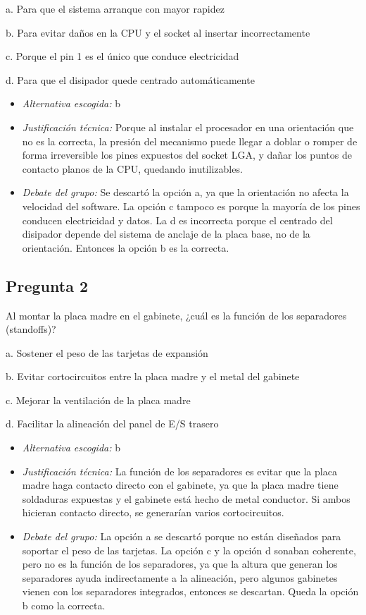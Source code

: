 \documentclass{article}
\begin{document}
a. Para que el sistema arranque con mayor rapidez 

b. Para evitar daños en la CPU y el socket al insertar incorrectamente

c. Porque el pin 1 es el único que conduce electricidad 

d. Para que el disipador quede centrado automáticamente

\begin{itemize}
\item \emph{Alternativa escogida:} b
\item \emph{Justificación técnica:} Porque al instalar el procesador en una orientación que no es la correcta, la presión del mecanismo puede llegar a doblar o romper de forma irreversible los pines expuestos del socket LGA, y dañar los puntos de contacto planos de la CPU, quedando inutilizables.
\item \emph{Debate del grupo:} Se descartó la opción a, ya que la orientación no afecta la velocidad del software. La opción c tampoco es porque la mayoría de los pines conducen electricidad y datos. La d es incorrecta porque el centrado del disipador depende del sistema de anclaje de la placa base, no de la orientación. Entonces la opción b es la correcta.
\end{itemize}
\subsection{Pregunta 2}
\label{sec:org309bfe6}
Al montar la placa madre en el gabinete, ¿cuál es la función de los separadores (standoffs)?

a. Sostener el peso de las tarjetas de expansión

b. Evitar cortocircuitos entre la placa madre y el metal del gabinete

c. Mejorar la ventilación de la placa madre

d. Facilitar la alineación del panel de E/S trasero

\begin{itemize}
\item \emph{Alternativa escogida:} b
\item \emph{Justificación técnica:} La función de los separadores es evitar que la placa madre haga contacto directo con el gabinete, ya que la placa madre tiene soldaduras expuestas y el gabinete está hecho de metal conductor. Si ambos hicieran contacto directo, se generarían varios cortocircuitos.
\item \emph{Debate del grupo:} La opción a se descartó porque no están diseñados para soportar el peso de las tarjetas. La opción c y la opción d sonaban coherente, pero no es la función de los separadores, ya que la altura que generan los separadores ayuda indirectamente a la alineación, pero algunos gabinetes vienen con los separadores integrados, entonces se descartan. Queda la opción b como la correcta.
\end{itemize}
\end{document}
